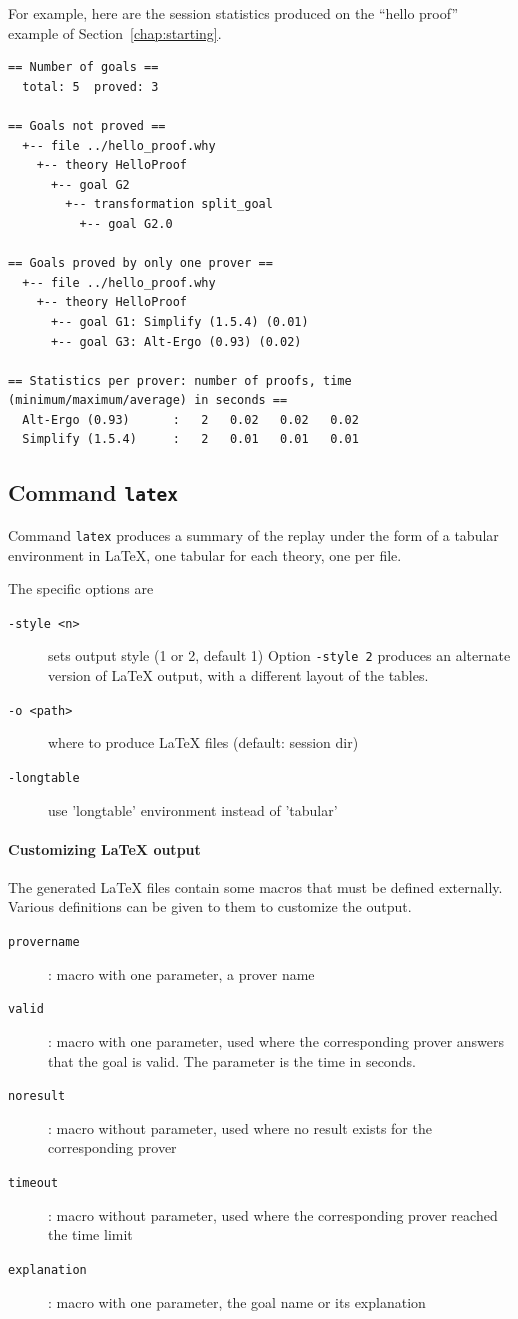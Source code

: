 For example, here are the session statistics produced on the ``hello
proof'' example of Section~\ref{chap:starting}.
{\footnotesize
\begin{verbatim}
== Number of goals ==
  total: 5  proved: 3

== Goals not proved ==
  +-- file ../hello_proof.why
    +-- theory HelloProof
      +-- goal G2
        +-- transformation split_goal
          +-- goal G2.0

== Goals proved by only one prover ==
  +-- file ../hello_proof.why
    +-- theory HelloProof
      +-- goal G1: Simplify (1.5.4) (0.01)
      +-- goal G3: Alt-Ergo (0.93) (0.02)

== Statistics per prover: number of proofs, time (minimum/maximum/average) in seconds ==
  Alt-Ergo (0.93)      :   2   0.02   0.02   0.02
  Simplify (1.5.4)     :   2   0.01   0.01   0.01
\end{verbatim}
}

\subsection{Command \texttt{latex}}

Command \texttt{latex} produces a summary of the replay under the form
of a tabular environment in LaTeX, one tabular for each theory, one
per file.

The specific options are
\begin{description}
\item[\texttt{-style <n>}] sets output style (1 or 2, default 1)
  Option \texttt{-style 2} produces an alternate version of LaTeX
  output, with a different layout of the tables.
\item[\texttt{-o <path>}] where
  to produce LaTeX files (default: session dir)
\item[\texttt{-longtable}] use 'longtable' environment instead of 'tabular'
\end{description}


\paragraph{Customizing LaTeX output}

The generated LaTeX files contain some macros that must be defined
externally.  Various definitions can be given to them to customize the
output.
\begin{description}
\item[\texttt{\bs{}provername}]: macro with one parameter, a prover name
\item[\texttt{\bs{}valid}]: macro with one parameter, used where the corresponding prover answers that the goal is valid. The parameter is the time in seconds.
\item[\texttt{\bs{}noresult}]: macro without parameter, used where no result
  exists for the corresponding prover
\item[\texttt{\bs{}timeout}]: macro without parameter, used where the corresponding prover reached the time limit
\item[\texttt{\bs{}explanation}]: macro with one parameter, the goal name or its explanation
\end{description}

